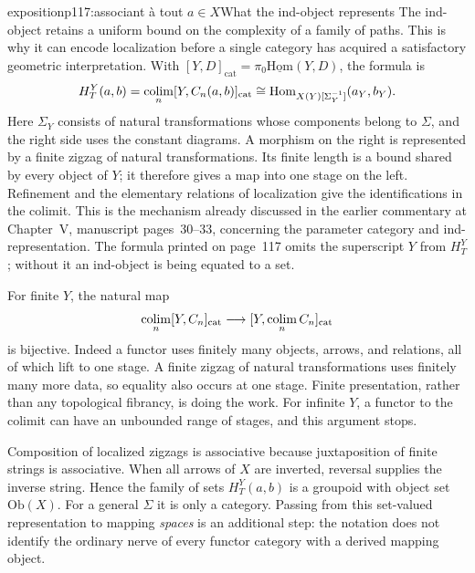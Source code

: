 \begin{dcomment}{exposition}{p117:associant à tout $a \in X$}{What the ind-object represents}
The ind-object retains a uniform bound on the complexity of a family of paths. This is why it can encode localization before a single category has acquired a satisfactory geometric interpretation. With $[Y,D]_{\mathrm{cat}}=\pi_0\underline{\mathrm{Hom}}(Y,D)$, the formula is
\[
 H_T^Y(a,b)=\mathop{\rm colim}_n[Y,C_n(a,b)]_{\mathrm{cat}}
 \cong\mathrm{Hom}_{X(Y)[\Sigma_Y^{-1}]}(a_Y,b_Y).
\]
Here $\Sigma_Y$ consists of natural transformations whose components belong to $\Sigma$, and the right side uses the constant diagrams. A morphism on the right is represented by a finite zigzag of natural transformations. Its finite length is a bound shared by every object of $Y$; it therefore gives a map into one stage on the left. Refinement and the elementary relations of localization give the identifications in the colimit. This is the mechanism already discussed in the earlier commentary at Chapter~V, manuscript pages~30--33, concerning the parameter category and ind-representation. The formula printed on page~117 omits the superscript $Y$ from $H_T^Y$; without it an ind-object is being equated to a set.

For finite $Y$, the natural map
\[
 \mathop{\rm colim}_n[Y,C_n]_{\mathrm{cat}}
       \longrightarrow [Y,\mathop{\rm colim}_n C_n]_{\mathrm{cat}}
\]
is bijective. Indeed a functor uses finitely many objects, arrows, and relations, all of which lift to one stage. A finite zigzag of natural transformations uses finitely many more data, so equality also occurs at one stage. Finite presentation, rather than any topological fibrancy, is doing the work. For infinite $Y$, a functor to the colimit can have an unbounded range of stages, and this argument stops.

Composition of localized zigzags is associative because juxtaposition of finite strings is associative. When all arrows of $X$ are inverted, reversal supplies the inverse string. Hence the family of sets $H_T^Y(a,b)$ is a groupoid with object set $\mathrm{Ob}(X)$. For a general $\Sigma$ it is only a category. Passing from this set-valued representation to mapping \emph{spaces} is an additional step: the notation does not identify the ordinary nerve of every functor category with a derived mapping object.
\end{dcomment}


